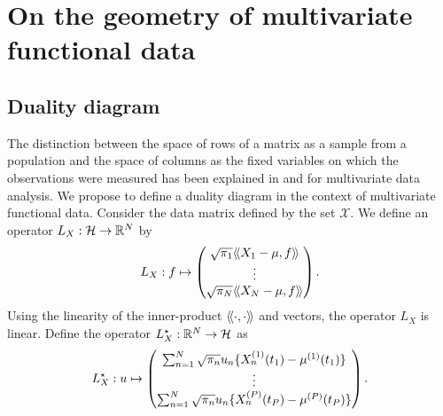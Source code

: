 \section{On the geometry of multivariate functional data} %
\label{sec:geometric_point_of_view_mfpca}

\subsection{Duality diagram} %
\label{sub:duality_diagram}

The distinction between the space of rows of a matrix as a sample from a population and the space of columns as the fixed variables on which the observations were measured has been explained in \cite{holmesMultivariateDataAnalysis2008} and \cite{delacruzDualityDiagramData2011} for multivariate data analysis. We propose to define a duality diagram in the context of multivariate functional data. Consider the data matrix defined by the set $\mathcal{X}$. We define an operator $L_X : \mathcal{H} \rightarrow \mathbb{R}^N$ by
\begin{equation}
    L_X: f \mapsto \begin{pmatrix}
        \sqrt{\pi_1}\langle\!\langle X_1 - \mu, f\rangle\!\rangle \\
        \vdots \\
        \sqrt{\pi_N}\langle\!\langle X_N - \mu, f\rangle\!\rangle
    \end{pmatrix}.
\end{equation}
Using the linearity of the inner-product $\langle\!\langle\cdot, \cdot\rangle\!\rangle$ and vectors, the operator $L_X$ is linear. Define the operator $L^\star_X : \mathbb{R}^N \rightarrow \mathcal{H}$ as
\begin{equation}
    L^\star_X: u \mapsto \begin{pmatrix}
       \sum_{n = 1}^N \sqrt{\pi_n} u_n \{X_n^{(1)}(t_1) - \mu^{(1)}(t_1)\} \\ 
       \vdots \\ 
       \sum_{n = 1}^N \sqrt{\pi_n} u_n \{X_n^{(P)}(t_P) - \mu^{(P)}(t_P)\}
    \end{pmatrix}.
\end{equation}

